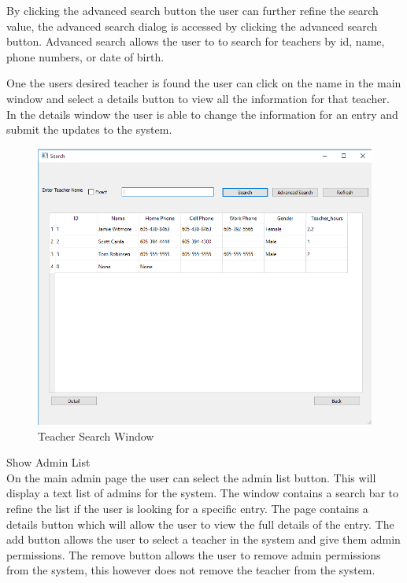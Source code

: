 By clicking the advanced search button the user can further refine the search value, the advanced search dialog is accessed by clicking the advanced search button. Advanced search allows the user to to search for teachers by id, name, phone numbers, or date of birth.

One the users desired teacher is found the user can click on the name in the main window and select a details button to view all the information for that teacher.  In the details window the user is able to change the information for an entry and submit the updates to the system.\\

\begin{figure}
  \includegraphics[width=\linewidth]{pics/userGuide/teacherSearch.png}
  \caption{Teacher Search Window}
  \label{fig:User doc: Teacher Search}
\end{figure}

Show Admin List\\
On the main admin page the user can select the admin list button. This will display a text list of admins for the system. The window contains a search bar to refine the list if the user is looking for a specific entry. The page contains a details button which will allow the user to view the full details of the entry. The add button allows the user to select a teacher in the system and give them admin permissions.  The remove button allows the user to remove admin permissions from the system, this however does not remove the teacher from the system.\\

